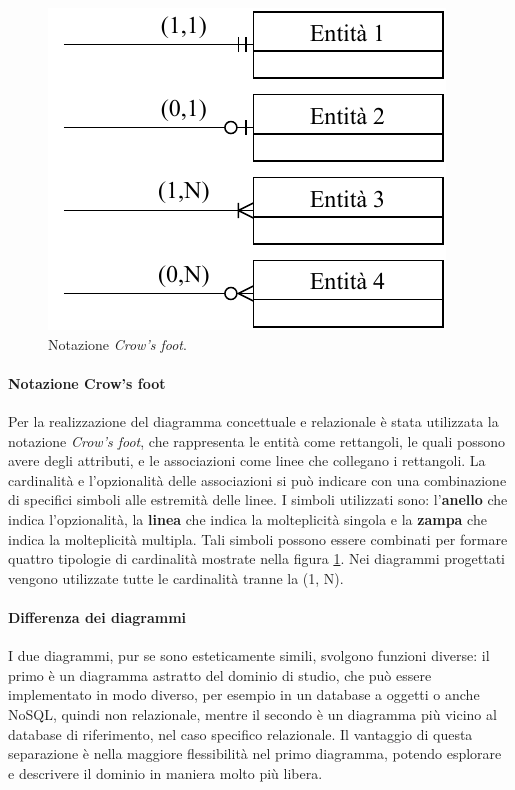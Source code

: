 \begin{figure}
\includegraphics{assets/03/crow.pdf}
\caption{Notazione \textit{Crow's foot}.}
\label{fig:crow}
\end{figure}

\paragraph{Notazione Crow's foot} Per la realizzazione del diagramma concettuale e relazionale è stata utilizzata la notazione \textit{Crow's foot}, che rappresenta le entità come rettangoli, le quali possono avere degli attributi, e le associazioni come linee che collegano i rettangoli. La cardinalità e l'opzionalità delle associazioni si può indicare con una combinazione di specifici simboli alle estremità delle linee. I simboli utilizzati sono: l'\textbf{anello} che indica l'opzionalità, la \textbf{linea} che indica la molteplicità singola e la \textbf{zampa} che indica la molteplicità multipla. Tali simboli possono essere combinati per formare quattro tipologie di cardinalità mostrate nella figura \ref{fig:crow}. Nei diagrammi progettati vengono utilizzate tutte le cardinalità tranne la (1, N).

\paragraph{Differenza dei diagrammi} I due diagrammi, pur se sono esteticamente simili, svolgono funzioni diverse: il primo è un diagramma astratto del dominio di studio, che può essere implementato in modo diverso, per esempio in un database a oggetti o anche NoSQL, quindi non relazionale, mentre il secondo è un diagramma più vicino al database di riferimento, nel caso specifico relazionale. Il vantaggio di questa separazione è nella maggiore flessibilità nel primo diagramma, potendo esplorare e descrivere il dominio in maniera molto più libera.

